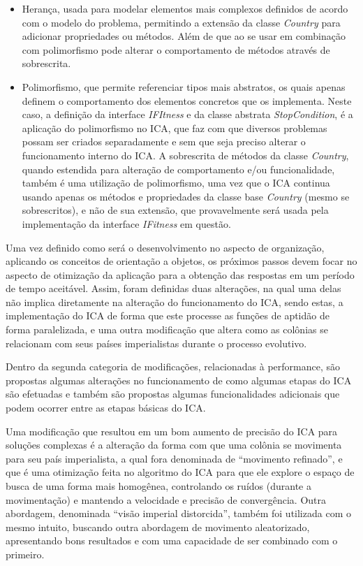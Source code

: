 \begin{itemize}
\item Herança, usada para modelar elementos mais complexos definidos de acordo com o modelo do problema, permitindo a extensão da classe \emph{Country} para adicionar propriedades ou métodos. Além de que ao se usar em combinação com polimorfismo pode alterar o comportamento de métodos através de sobrescrita.

\item Polimorfismo, que permite referenciar tipos mais abstratos, os quais apenas definem o comportamento dos elementos concretos que os implementa. Neste caso, a definição da interface \emph{IFItness} e da classe abstrata \emph{StopCondition}, é a aplicação do polimorfismo no ICA, que faz com que diversos problemas possam ser criados separadamente e sem que seja preciso alterar o funcionamento interno do  ICA.
A sobrescrita de métodos da classe \emph{Country}, quando estendida para alteração de comportamento e/ou funcionalidade, também é uma utilização de polimorfismo, uma vez que o ICA continua usando apenas os métodos e propriedades da classe base \emph{Country} (mesmo se sobrescritos), e não de sua extensão, que provavelmente será usada pela implementação da interface \emph{IFitness} em questão.
\end{itemize}

Uma vez definido como será o desenvolvimento no aspecto de organização, aplicando os conceitos de orientação a objetos, os próximos passos devem focar no aspecto de otimização da aplicação para a obtenção das respostas em um período de tempo aceitável. Assim, foram definidas duas alterações, na qual uma delas não implica diretamente na alteração do funcionamento do ICA, sendo estas, a implementação do ICA de forma que este processe as funções de aptidão de forma paralelizada, e uma outra modificação que altera como as colônias se relacionam com seus países imperialistas durante o processo evolutivo.

Dentro da segunda categoria de  modificações, relacionadas à performance, são propostas algumas alterações no funcionamento de como algumas etapas do ICA são efetuadas e também são propostas algumas funcionalidades adicionais que podem ocorrer entre as etapas básicas do ICA.

Uma modificação que resultou em um bom aumento de precisão do ICA para soluções complexas é a alteração da forma com que uma colônia se movimenta para seu país imperialista, a qual fora denominada de “movimento refinado”, e que é uma otimização feita no algoritmo do ICA para que ele explore o espaço de busca de uma forma mais homogênea, controlando os ruídos (durante a movimentação) e mantendo a velocidade e precisão de convergência. Outra abordagem, denominada “visão imperial distorcida”, também foi utilizada com o mesmo intuito, buscando outra abordagem de movimento aleatorizado, apresentando bons resultados e com uma capacidade de ser combinado com o primeiro.

